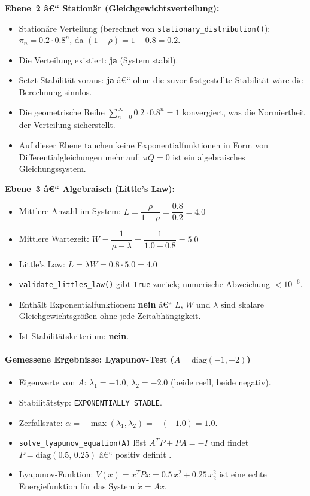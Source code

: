 ﻿\documentclass[a4paper,12pt]{report}
\theoremstyle{definition}
\begin{document}
\textbf{Ebene~2 â€“ Stationär (Gleichgewichtsverteilung):}
\begin{itemize}
	\item Stationäre Verteilung (berechnet von
	\texttt{stationary\_distribution()}):
	$\pi_n = 0.2 \cdot 0.8^n$, da $(1-\rho) = 1 - 0.8 = 0.2$.
	\item Die Verteilung existiert: \textbf{ja} (System stabil).
	\item Setzt Stabilität voraus: \textbf{ja} â€“ ohne die zuvor
	festgestellte Stabilität wäre die Berechnung sinnlos.
	\item Die geometrische Reihe $\sum_{n=0}^\infty 0.2 \cdot 0.8^n = 1$
	konvergiert, was die Normiertheit der Verteilung sicherstellt.
	\item Auf dieser Ebene tauchen keine Exponentialfunktionen in Form
	von Differentialgleichungen mehr auf: $\pi Q = 0$ ist ein
	algebraisches Gleichungssystem.
\end{itemize}

\textbf{Ebene~3 â€“ Algebraisch (Little's Law):}
\begin{itemize}
	\item Mittlere Anzahl im System:
	$L = \dfrac{\rho}{1-\rho} = \dfrac{0.8}{0.2} = 4.0$
	\item Mittlere Wartezeit:
	$W = \dfrac{1}{\mu - \lambda} = \dfrac{1}{1.0 - 0.8} = 5.0$
	\item Little's Law:
	$L = \lambda W = 0.8 \cdot 5.0 = 4.0$ \checkmark
	\item \texttt{validate\_littles\_law()} gibt \texttt{True} zurück;
	numerische Abweichung $< 10^{-6}$.
	\item Enthält Exponentialfunktionen: \textbf{nein} â€“ $L$, $W$ und
	$\lambda$ sind skalare Gleichgewichtsgrößen ohne jede
	Zeitabhängigkeit.
	\item Ist Stabilitätskriterium: \textbf{nein}.
\end{itemize}

\paragraph{Gemessene Ergebnisse: Lyapunov-Test ($A = \text{diag}(-1,-2)$)}

\begin{itemize}
	\item Eigenwerte von $A$: $\lambda_1 = -1.0$, $\lambda_2 = -2.0$
	(beide reell, beide negativ).
	\item Stabilitätstyp: \texttt{EXPONENTIALLY\_STABLE}.
	\item Zerfallsrate: $\alpha = -\max(\lambda_1, \lambda_2) =
	-(-1.0) = 1.0$.
	\item \texttt{solve\_lyapunov\_equation(A)} löst $A^T P + PA = -I$
	und findet
	$P = \text{diag}(0.5,\, 0.25)$ â€“ positiv definit \checkmark.
	\item Lyapunov-Funktion: $V(x) = x^T P x = 0.5\,x_1^2 + 0.25\,x_2^2$
	ist eine echte Energiefunktion für das System $\dot{x} = Ax$.
\end{itemize}
\end{document}
